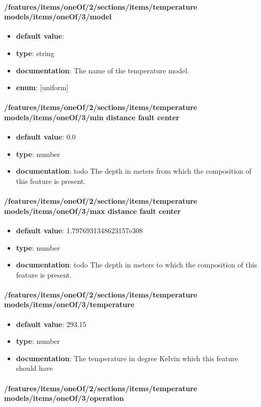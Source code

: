 \paragraph{/features/items/oneOf/2/sections/items/temperature models/items/oneOf/3/model}
\begin{itemize}\item {\bf default value}: 
\item {\bf type}: string
\item {\bf documentation}: The name of the temperature model.
\item {\bf enum}: [uniform]\end{itemize}\paragraph{/features/items/oneOf/2/sections/items/temperature models/items/oneOf/3/min distance fault center}
\begin{itemize}\item {\bf default value}: 0.0
\item {\bf type}: number
\item {\bf documentation}: todo The depth in meters from which the composition of this feature is present.
\end{itemize}\paragraph{/features/items/oneOf/2/sections/items/temperature models/items/oneOf/3/max distance fault center}
\begin{itemize}\item {\bf default value}: 1.7976931348623157e308
\item {\bf type}: number
\item {\bf documentation}: todo The depth in meters to which the composition of this feature is present.
\end{itemize}\paragraph{/features/items/oneOf/2/sections/items/temperature models/items/oneOf/3/temperature}
\begin{itemize}\item {\bf default value}: 293.15
\item {\bf type}: number
\item {\bf documentation}: The temperature in degree Kelvin which this feature should have
\end{itemize}\paragraph{/features/items/oneOf/2/sections/items/temperature models/items/oneOf/3/operation}
